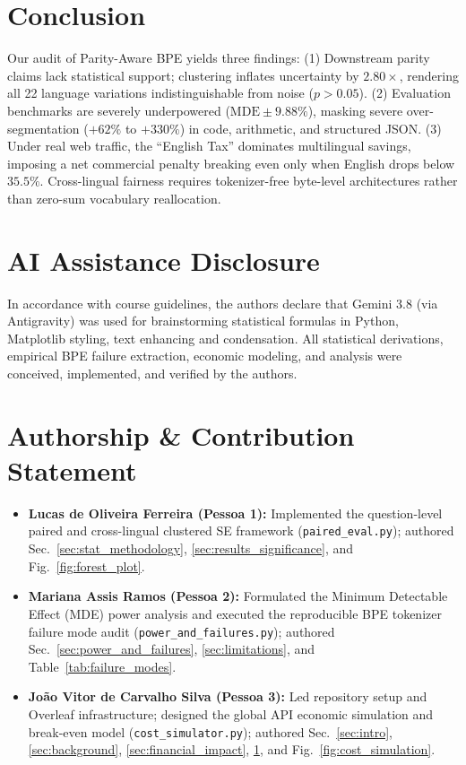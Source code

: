 \documentclass[sigconf,nonacm]{acmart}
\begin{document}
\section{Conclusion}
\label{sec:conclusion}

Our audit of Parity-Aware BPE yields three findings:
(1) Downstream parity claims lack statistical support; clustering inflates uncertainty by $2.80\times$, rendering all 22 language variations indistinguishable from noise ($p > 0.05$).
(2) Evaluation benchmarks are severely underpowered ($\mathrm{MDE} \pm 9.88\%$), masking severe over-segmentation ($+62\%$ to $+330\%$) in code, arithmetic, and structured JSON.
(3) Under real web traffic, the ``English Tax'' dominates multilingual savings, imposing a net commercial penalty breaking even only when English drops below $35.5\%$.
Cross-lingual fairness requires tokenizer-free byte-level architectures rather than zero-sum vocabulary reallocation.

\section*{AI Assistance Disclosure}
In accordance with course guidelines, the authors declare that Gemini 3.8 (via Antigravity) was used for brainstorming statistical formulas in Python, Matplotlib styling, text enhancing and condensation. All statistical derivations, empirical BPE failure extraction, economic modeling, and analysis were conceived, implemented, and verified by the authors.

\section*{Authorship \& Contribution Statement}

\begin{itemize}
    \item \textbf{Lucas de Oliveira Ferreira (Pessoa 1):}
    Implemented the question-level paired and cross-lingual clustered SE framework (\texttt{paired\_eval.py}); authored Sec.~\ref{sec:stat_methodology}, \ref{sec:results_significance}, and Fig.~\ref{fig:forest_plot}.

    \item \textbf{Mariana Assis Ramos (Pessoa 2):}
    Formulated the Minimum Detectable Effect (MDE) power analysis and executed the reproducible BPE tokenizer failure mode audit (\texttt{power\_and\_failures.py}); authored Sec.~\ref{sec:power_and_failures}, \ref{sec:limitations}, and Table~\ref{tab:failure_modes}.
    
    \item \textbf{João Vitor de Carvalho Silva (Pessoa 3):}
    Led repository setup and Overleaf infrastructure; designed the global API economic simulation and break-even model (\texttt{cost\_simulator.py}); authored Sec.~\ref{sec:intro}, \ref{sec:background}, \ref{sec:financial_impact}, \ref{sec:conclusion}, and Fig.~\ref{fig:cost_simulation}.
\end{itemize}



\end{document}
